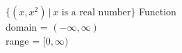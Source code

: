 {$\{ \left(x,x^2\right) \, | \, \text{$x$ is a real number} \}$}
{Function \\ domain = $(-\infty, \infty)$ \\  range = $[0,\infty)$}